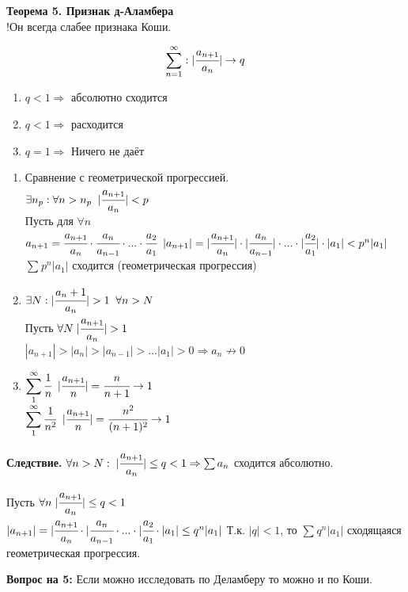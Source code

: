 \documentclass[12pt, a4paper]{article}
\begin{document}
\textbf{Теорема 5. Признак д-Аламбера}\\
!Он всегда слабее признака Коши.
\begin{tcolorbox}
	\[
		\sum_{n=1}^{\infty}: |\cfrac{a_{n+1}}{a_{n}}| \to q
	\]
\begin{enumerate}
	\item $q < 1 \Rightarrow$ абсолютно сходится
	\item $q < 1 \Rightarrow$ расходится
	\item $q = 1 \Rightarrow$ Ничего не даёт
\end{enumerate}
\end{tcolorbox}

\begin{tcolorbox}[title=Доказательство.]
	\begin{enumerate}
		\item  Сравнение с геометрической прогрессией.\\
		$\exists n_p: \forall n > n_p \;\; |\cfrac{a_{n + 1}}{a_n}| < p$\\
		Пусть для $\forall n$\\
		$ a_{n+1} = \cfrac{a_{n+1}}{a_n} \cdot  \cfrac{a_{n}}{a_{n-1}} \cdot ... \cdot \cfrac{a_{2}}{a_1} $
		$ |a_{n+1}| = |\cfrac{a_{n+1}}{a_n}| \cdot  |\cfrac{a_{n}}{a_{n-1}}| \cdot ... \cdot |\cfrac{a_{2}}{a_1}| \cdot |a_1| < p^n |a_1| $\\
		$ \displaystyle\sum_{}^{} p^n |a_1|$ сходится (геометрическая прогрессия)
	\item $\exists N: |\cfrac{a{_n+1}}{a_n}| > 1\;\; \forall n > N$\\
		Пусть $ \forall N\; |\cfrac{a_{n+1}}{a_n}| > 1 $\\
		$ |a_{n+1}| > |a_{n}| > |a_{n-1}| > ... |a_{1}| > 0 \Rightarrow a_n \not\to 0$
	\item $ \displaystyle\sum_{1}^{\infty} \cfrac{1}{n}\;\; |\cfrac{a_{n+1}}{n}| = \cfrac{n}{n+1} \to 1$\\
		$ \displaystyle\sum_{1}^{\infty} \cfrac{1}{n^2}\;\; |\cfrac{a_{n+1}}{n}| = \cfrac{n^2}{(n+1)^2} \to 1$\\
 	\end{enumerate}
\end{tcolorbox}

\textbf{Следствие.} $\forall n > N:\; |\cfrac{a_{n+1}}{a_n}| \leq q < 1 \Rightarrow \sum a_n$ сходится абсолютно.

\begin{tcolorbox}[title=Доказательство следствия]
	Пусть $ \forall n\; |\cfrac{a_{n+1}}{a_n}| \leq q < 1 $\\
$ |a_{n+1}| = |\cfrac{a_{n+1}}{a_n} \cdot |\cfrac{a_{n}}{a_{n-1}} \cdot ... \cdot |\cfrac{a_{2}}{a_1} \cdot |a_1| \leq q^n |a_1|$ Т.к. $|q| < 1$, то $\displaystyle\sum_{}^{} q^n|a_1|$ сходящаяся геометрическая прогрессия.
\end{tcolorbox}
\textbf{Вопрос на 5:} Если можно исследовать по Деламберу то можно и по Коши.\\
\end{document}
